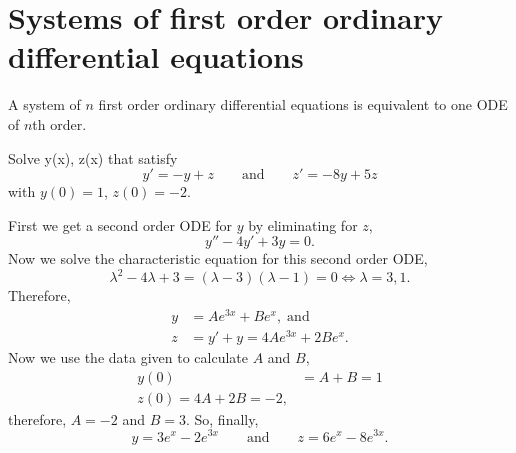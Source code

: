 \section{Systems of first order ordinary differential equations}

A system of $n$ first order ordinary differential equations is equivalent to one ODE of $n$th order. 

\begin{example}
    Solve y(x), z(x) that satisfy \[y'=-y+z\qquad\text{and}\qquad z'=-8y+5z\] with $y(0)=1$, $z(0)=-2$.
    
    First we get a second order ODE for $y$ by eliminating for $z$, \[y''-4y'+3y=0.\] Now we solve the characteristic equation for this second order ODE, \[\lambda^2-4\lambda+3=(\lambda-3)(\lambda-1)=0\iff\lambda=3,1.\] Therefore,
    \begin{align*}
        y&=Ae^{3x}+Be^x,\;\text{and}\\
        z&=y'+y=4Ae^{3x}+2Be^x.
    \end{align*}
    Now we use the data given to calculate $A$ and $B$,
    \begin{align*}
        y(0)&=A+B=1\\
        z(0)=4A+2B=-2,
    \end{align*}
    therefore, $A=-2$ and $B=3$. So, finally, \[y=3e^x-2e^{3x}\qquad\text{and}\qquad z=6e^x-8e^{3x}.\]
\end{example}
